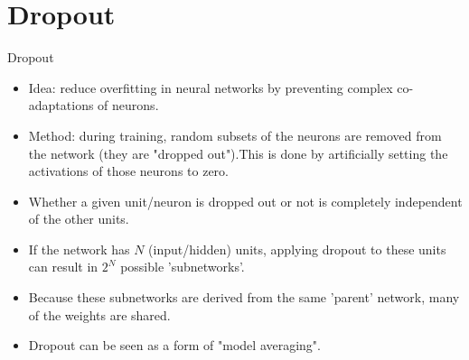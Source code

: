 \section{Dropout}

\begin{vbframe}{Dropout}
  \begin{itemize}
    \item %
    Idea: reduce overfitting in neural networks by preventing complex co-adaptations of neurons.
    \item Method: during training, random subsets of the neurons are removed from the network (they are "dropped out").This is done by artificially setting the activations of those neurons to zero.
    \item Whether a given unit/neuron is dropped out or not is completely independent of the other units.
    \item If the network has $N$ (input/hidden) units, applying dropout to these units can result in $2^N$ possible 'subnetworks'.
    \item Because these subnetworks are derived from the same 'parent' network, many of the weights are shared.
    \item Dropout can be seen as a form of "model averaging".
  \end{itemize}
\framebreak
  \begin{figure}
    \centering

\end{figure}
\end{vbframe}
